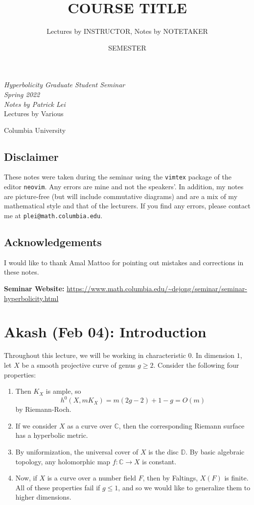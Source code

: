 \documentclass[leqno, openany]{memoir}
\title{COURSE TITLE}
\author{Lectures by INSTRUCTOR, Notes by NOTETAKER}
\date{SEMESTER}
\theoremstyle{definition}
\theoremstyle{remark}
\theoremstyle{plain}
\theoremstyle{definition}
\theoremstyle{remark}
\newcommand{\C}{\mathbb{C}}
\newcommand*{\titleSW}
    {\begingroup%
    \raggedleft
    \vspace*{\baselineskip}
    {\Huge\itshape Hyperbolicity Graduate Student Seminar \\ Spring 2022}\\[\baselineskip]
    {\large\itshape Notes by Patrick Lei}\\[0.2\textheight]
    {\Large Lectures by Various}\par
    \vfill
    {\Large \sffamily Columbia University}
    \vspace*{\baselineskip}
\endgroup}
\begin{document}
    
\begin{titlingpage}
\titleSW
\end{titlingpage}

\thispagestyle{empty}
\section*{Disclaimer}%
\label{sec:disclaimer}

These notes were taken during the seminar using the \texttt{vimtex} package of the editor \texttt{neovim}. 
Any errors are mine and not the speakers'. 
In addition, my notes are picture-free (but will include commutative diagrams) and are a mix of my mathematical style and that of the lecturers.
If you find any errors, please contact me at \texttt{plei@math.columbia.edu}.

\section*{Acknowledgements}
I would like to thank Amal Mattoo for pointing out mistakes and corrections in these notes.

\vspace*{1cm}

\noindent\textbf{Seminar Website:}  \url{https://www.math.columbia.edu/~dejong/seminar/seminar-hyperbolicity.html}
\newpage

\tableofcontents

\chapter{Akash (Feb 04): Introduction}%

Throughout this lecture, we will be working in characteristic 0. In dimension $1$, let $X$ be a smooth projective curve of genus $g \geq 2$. Consider the following four properties: 
\begin{enumerate}[(1)]
    \item Then $K_X$ is ample, so 
    \[ h^0 (X, m K_X) = m (2g-2) + 1-g = O(m) \]
    by Riemann-Roch. 
    \item If we consider $X$ as a curve over $\C$, then the corresponding Riemann surface has a hyperbolic metric. 
    \item By uniformization, the universal cover of $X$ is the disc $\mathbb{D}$. By basic algebraic topology, any holomorphic map $f \colon \C \to X$ is constant. 
    \item Now, if $X$ is a curve over a number field $F$, then by Faltings, $X(F)$ is finite. All of these properties fail if $g \leq 1$, and so we would like to generalize them to higher dimensions.
\end{enumerate}
\end{document}
